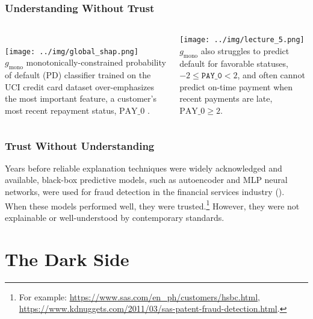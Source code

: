 \documentclass[11pt,aspectratio=169,hyperref={colorlinks}]{beamer}
\begin{document}
	\begin{frame}[label={no_trust}]
	
		\frametitle{Understanding Without Trust}
		
					\begin{columns}
				
						\centering
						\vspace{7pt}\\
						\texttt{[image: ../img/global\_shap.png]}\\
						\vspace{5pt}
						\tiny{$g_{\text{mono}}$ monotonically-constrained probability of default (PD) classifier trained on the UCI credit card dataset over-emphasizes the most important feature, a customer's most recent repayment status, $\text{PAY\_0}$ \cite{uci}.}

						\vspace{10pt}
						\centering
						\texttt{[image: ../img/lecture\_5.png]}\\
						\vspace{5pt}
						\tiny{$g_{\text{mono}}$ also struggles to predict default for favorable statuses, $-2  \leq \texttt{PAY\_0}  < 2$, and often cannot predict on-time payment when recent payments are late, $\text{PAY\_0} \geq 2$}.
				
					\end{columns}
					\normalsize				
		
	\end{frame}
	
	\begin{frame}
	
		\frametitle{Trust Without Understanding}
		\Large
		Years before reliable explanation techniques were widely acknowledged and available, black-box predictive models, such as autoencoder and MLP neural networks, were used for fraud detection in the financial services industry (\citet{gopinathan1998fraud}). When these models performed well, they were trusted.\footnote{\tiny{For example: \url{https://www.sas.com/en_ph/customers/hsbc.html}, \url{https://www.kdnuggets.com/2011/03/sas-patent-fraud-detection.html}}.} However, they were not explainable or well-understood by contemporary standards.  

	\end{frame}


	\section{The Dark Side}
\end{document}
